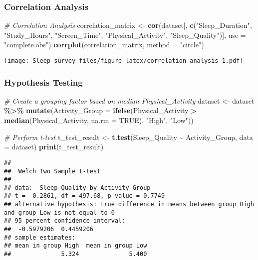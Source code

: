 \documentclass[
]{article}
\newenvironment{Shaded}{\begin{snugshade}}{\end{snugshade}}
\newcommand{\AttributeTok}[1]{\textcolor[rgb]{0.13,0.29,0.53}{#1}}
\newcommand{\CommentTok}[1]{\textcolor[rgb]{0.56,0.35,0.01}{\textit{#1}}}
\newcommand{\ConstantTok}[1]{\textcolor[rgb]{0.56,0.35,0.01}{#1}}
\newcommand{\FunctionTok}[1]{\textcolor[rgb]{0.13,0.29,0.53}{\textbf{#1}}}
\newcommand{\NormalTok}[1]{#1}
\newcommand{\OtherTok}[1]{\textcolor[rgb]{0.56,0.35,0.01}{#1}}
\newcommand{\SpecialCharTok}[1]{\textcolor[rgb]{0.81,0.36,0.00}{\textbf{#1}}}
\newcommand{\StringTok}[1]{\textcolor[rgb]{0.31,0.60,0.02}{#1}}
\begin{document}
\subsubsection{Correlation Analysis}\label{correlation-analysis}

\begin{Shaded}
\begin{Highlighting}[]
\CommentTok{\# Correlation Analysis}
\NormalTok{correlation\_matrix }\OtherTok{\textless{}{-}} \FunctionTok{cor}\NormalTok{(dataset[, }\FunctionTok{c}\NormalTok{(}\StringTok{"Sleep\_Duration"}\NormalTok{, }\StringTok{"Study\_Hours"}\NormalTok{, }\StringTok{"Screen\_Time"}\NormalTok{, }\StringTok{"Physical\_Activity"}\NormalTok{, }\StringTok{"Sleep\_Quality"}\NormalTok{)], }\AttributeTok{use =} \StringTok{"complete.obs"}\NormalTok{)}
\FunctionTok{corrplot}\NormalTok{(correlation\_matrix, }\AttributeTok{method =} \StringTok{"circle"}\NormalTok{)}
\end{Highlighting}
\end{Shaded}

\texttt{[image: Sleep-survey\_files/figure-latex/correlation-analysis-1.pdf]}

\subsubsection{Hypothesis Testing}\label{hypothesis-testing}

\begin{Shaded}
\begin{Highlighting}[]
\CommentTok{\# Create a grouping factor based on median Physical\_Activity}
\NormalTok{dataset }\OtherTok{\textless{}{-}}\NormalTok{ dataset }\SpecialCharTok{\%\textgreater{}\%}
  \FunctionTok{mutate}\NormalTok{(}\AttributeTok{Activity\_Group =} \FunctionTok{ifelse}\NormalTok{(Physical\_Activity }\SpecialCharTok{\textgreater{}} \FunctionTok{median}\NormalTok{(Physical\_Activity, }\AttributeTok{na.rm =} \ConstantTok{TRUE}\NormalTok{), }\StringTok{"High"}\NormalTok{, }\StringTok{"Low"}\NormalTok{))}

\CommentTok{\# Perform t{-}test}
\NormalTok{t\_test\_result }\OtherTok{\textless{}{-}} \FunctionTok{t.test}\NormalTok{(Sleep\_Quality }\SpecialCharTok{\textasciitilde{}}\NormalTok{ Activity\_Group, }\AttributeTok{data =}\NormalTok{ dataset)}
\FunctionTok{print}\NormalTok{(t\_test\_result)}
\end{Highlighting}
\end{Shaded}

\begin{verbatim}
## 
##  Welch Two Sample t-test
## 
## data:  Sleep_Quality by Activity_Group
## t = -0.2861, df = 497.68, p-value = 0.7749
## alternative hypothesis: true difference in means between group High and group Low is not equal to 0
## 95 percent confidence interval:
##  -0.5979206  0.4459206
## sample estimates:
## mean in group High  mean in group Low 
##              5.324              5.400
\end{verbatim}
\end{document}
